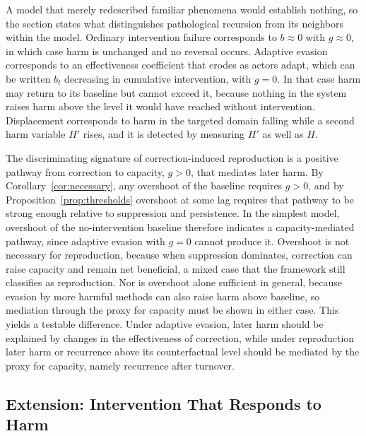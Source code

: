 \documentclass[12pt]{article}
\theoremstyle{remark}
\begin{document}
A model that merely redescribed familiar phenomena would establish nothing, so the section states what distinguishes pathological recursion from its neighbors within the model. Ordinary intervention failure corresponds to $b \approx 0$ with $g \approx 0$, in which case harm is unchanged and no reversal occurs. Adaptive evasion corresponds to an effectiveness coefficient that erodes as actors adapt, which can be written $b_t$ decreasing in cumulative intervention, with $g = 0$. In that case harm may return to its baseline but cannot exceed it, because nothing in the system raises harm above the level it would have reached without intervention. Displacement corresponds to harm in the targeted domain falling while a second harm variable $H'$ rises, and it is detected by measuring $H'$ as well as $H$.

The discriminating signature of correction-induced reproduction is a positive pathway from correction to capacity, $g > 0$, that mediates later harm. By Corollary~\ref{cor:necessary}, any overshoot of the baseline requires $g > 0$, and by Proposition~\ref{prop:thresholds} overshoot at some lag requires that pathway to be strong enough relative to suppression and persistence. In the simplest model, overshoot of the no-intervention baseline therefore indicates a capacity-mediated pathway, since adaptive evasion with $g = 0$ cannot produce it. Overshoot is not necessary for reproduction, because when suppression dominates, correction can raise capacity and remain net beneficial, a mixed case that the framework still classifies as reproduction. Nor is overshoot alone sufficient in general, because evasion by more harmful methods can also raise harm above baseline, so mediation through the proxy for capacity must be shown in either case. This yields a testable difference. Under adaptive evasion, later harm should be explained by changes in the effectiveness of correction, while under reproduction later harm or recurrence above its counterfactual level should be mediated by the proxy for capacity, namely recurrence after turnover.

\subsection{Extension: Intervention That Responds to Harm}
\end{document}
